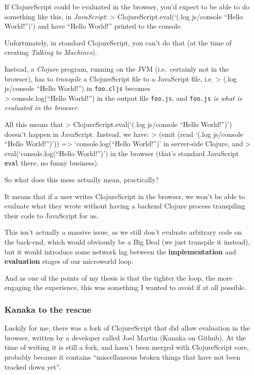If ClojureScript could be evaluated in the browser, you'd expect to be
able to do something like this, in \emph{JavaScript}: \textgreater{}
ClojureScript.eval(`(.log js/console ``Hello World!'')') and have
``Hello World!'' printed to the console.

Unfortunately, in standard ClojureScript, you can't do that (at the time
of creating \emph{Talking to Machines}).

Instead, a \emph{Clojure} program, running on the JVM (i.e.~certainly
not in the browser), has to \emph{transpile} a ClojureScript file to a
JavaScript file, i.e. \textgreater{} (.log js/console ``Hello World!'')
in \texttt{foo.cljs} becomes\\\textgreater{} console.log(``Hello
World!'') in the output file \texttt{foo.js}, and \texttt{foo.js}
\emph{is what is evaluated in the browser}.

All this means that \textgreater{} ClojureScript.eval(`(.log js/console
``Hello World!'')') doesn't happen in JavaScript. Instead, we have:
\textgreater{} (emit (read `(.log js/console ``Hello World!'')'))
=\textgreater{} `console.log(``Hello World!'')' in server-side Clojure,
and \textgreater{} eval(`console.log(``Hello World!'')') in the browser
(that's standard JavaScript \texttt{eval} there, no funny business).

So what does this mess actually mean, practically?

It means that if a user writes ClojureScript in the browser, we won't be
able to evaluate what they wrote without having a backend Clojure
process transpiling their code to JavaScript for us.

This isn't actually a massive issue, as we still don't evaluate
arbitrary code on the back-end, which would obviously be a Big Deal (we
just transpile it instead), but it would introduce some network lag
between the \textbf{implementation} and \textbf{evaluation} stages of
our microworld loop.

And as one of the points of my thesis is that the tighter the loop, the
more engaging the experience, this was something I wanted to avoid if at
all possible.

\subsubsection{Kanaka to the rescue}

Luckily for me, there was a fork of ClojureScript that did allow
evaluation in the browser, written by a developer called Joel Martin
(Kanaka on Github). At the time of writing it is still a fork, and
hasn't been merged with ClojureScript core, probably because it contains
``miscellaneous broken things that have not been tracked down yet''.


